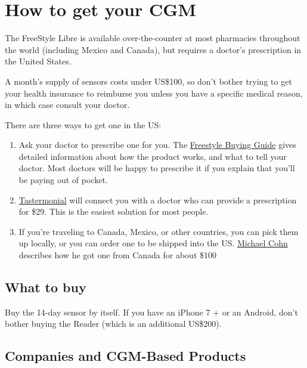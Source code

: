 \documentclass[
]{book}
\begin{document}
\hypertarget{how-to-get-your-cgm}{%
\chapter{How to get your CGM}\label{how-to-get-your-cgm}}

The FreeStyle Libre is available over-the-counter at most pharmacies throughout the world (including Mexico and Canada), but requires a doctor's prescription in the United States.

A month's supply of sensors costs under US\$100, so don't bother trying to get your health insurance to reimburse you unless you have a specific medical reason, in which case consult your doctor.

There are three ways to get one in the US:

\begin{enumerate}
\def\labelenumi{\arabic{enumi}.}
\item
  Ask your doctor to prescribe one for you. The \href{https://www.freestylelibre.us/support/buying-guide.html}{Freestyle Buying Guide} gives detailed information about how the product works, and what to tell your doctor. Most doctors will be happy to prescribe it if you explain that you'll be paying out of pocket.
\item
  \href{https://tastermonial.com/products/cgm-freestyle-libre}{Tastermonial} will connect you with a doctor who can provide a prescription for \$29. This is the easiest solution for most people.
\item
  If you're traveling to Canada, Mexico, or other countries, you can pick them up locally, or you can order one to be shipped into the US. \href{https://octern.medium.com/how-to-get-a-continuous-glucose-monitor-d48cd229e9ac}{Michael Cohn} describes how he got one from Canada for about \$100
\end{enumerate}

\hypertarget{what-to-buy}{%
\section{What to buy}\label{what-to-buy}}

Buy the 14-day sensor by itself. If you have an iPhone 7 + or an Android, don't bother buying the Reader (which is an additional US\$200).

\hypertarget{companies-and-cgm-based-products}{%
\section{Companies and CGM-Based Products}\label{companies-and-cgm-based-products}}
\end{document}
